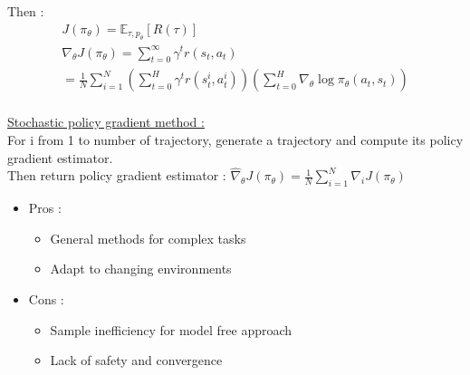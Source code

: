 \documentclass[../main.tex]{subfiles}
\begin{document}
Then : \begin{equation} \begin{gathered}
    J(\pi_\theta) = \mathbb{E}_{\tau, p_\theta} [R(\tau)]\\
    \nabla_\theta J(\pi_\theta) = \sum_{t=0}^\infty \gamma^tr(s_t,a_t)\\
    = \frac{1}{N} \sum_{i=1}^N (\sum_{t=0}^H \gamma^t r(s_t^i, a_t^i)) (\sum_{t=0}^H \nabla_\theta \log \pi_\theta(a_t,s_t))\\
    \end{gathered}
\end{equation}

\quad \underline{Stochastic policy gradient method :}\\
For i from 1 to number of trajectory, generate a trajectory and compute its policy gradient estimator.\\
Then return policy gradient estimator : $\hat{\nabla}_\theta J(\pi_\theta) = \frac{1}{N} \sum_{i=1}^N \nabla_i J(\pi_\theta)$\\

\begin{itemize}
    \item Pros : \begin{itemize}
        \item General methods for complex tasks\\
        \item Adapt to changing environments\\
    \end{itemize}
    \item Cons : \begin{itemize}
        \item Sample inefficiency for model free approach\\
        \item Lack of safety and convergence\\
    \end{itemize}
\end{itemize}
\end{document}

